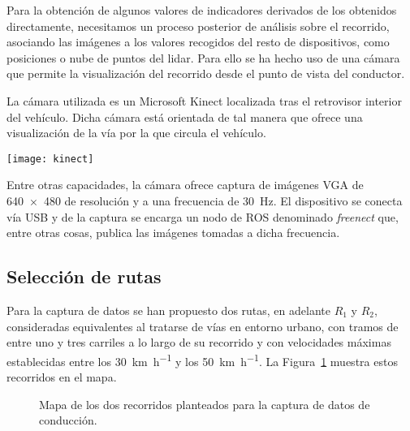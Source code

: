 Para la obtención de algunos valores de indicadores derivados de los obtenidos directamente, necesitamos un proceso posterior de análisis sobre el recorrido, asociando las imágenes a los valores recogidos del resto de dispositivos, como posiciones o nube de puntos del \acrshort{lidar}. Para ello se ha hecho uso de una cámara que permite la visualización del recorrido desde el punto de vista del conductor.

La cámara utilizada es un Microsoft Kinect localizada tras el retrovisor interior del vehículo. Dicha cámara está orientada de tal manera que ofrece una visualización de la vía por la que circula el vehículo.

\begin{marginfigure}
	\centering
	\texttt{[image: kinect]}
	\caption[Cámara Microsoft Kinect]{La cámara Kinect desarrollada por Microsoft ofrece imágenes a color a una velocidad de \SI{30}{\fps} con una resolución de \SI{640x480}{\px}.}
	\label{fig:kinect}
\end{marginfigure}

Entre otras capacidades, la cámara ofrece captura de imágenes VGA de \SI{640x480}{\px} de resolución y a una frecuencia de \SI{30}{\Hz}. El dispositivo se conecta vía USB y de la captura se encarga un nodo de ROS denominado \textit{freenect} 	que, entre otras cosas, publica las imágenes tomadas a dicha frecuencia.

\subsection{Selección de rutas}

Para la captura de datos se han propuesto dos rutas, en adelante $R_1$ y $R_2$, consideradas equivalentes al tratarse de vías en entorno urbano, con tramos de entre uno y tres carriles a lo largo de su recorrido y con velocidades máximas establecidas entre los \SI{30}{\km\per\hour} y los \SI{50}{\km\per\hour}. La Figura~\ref{fig:proposed-routes} muestra estos recorridos en el mapa.

\begin{figure}
	\centering
	\qquad
	\caption[Mapa de los dos recorridos planteados para la captura de datos de conducción]{Mapa de los dos recorridos planteados para la captura de datos de conducción.}
	\label{fig:proposed-routes}
\end{figure}

